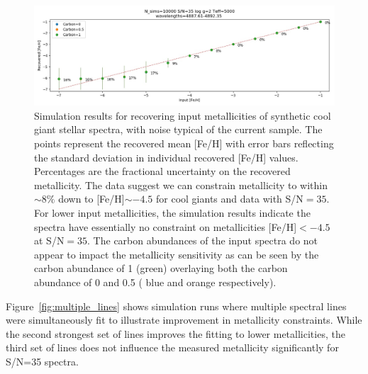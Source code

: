 \documentclass[]{aastex631}
\newcommand{\feh}{[Fe/H]\xspace}
\begin{document}
\begin{figure}
    \includegraphics[width=\linewidth]{Plots/sim_plots/Nsim10000_SN35_logg2_T5000_Thomas_4890.jpg}
    \caption{Simulation results for recovering input metallicities of synthetic cool giant stellar spectra, with noise typical of the current sample. The points represent the recovered mean \feh with error bars reflecting the standard deviation in individual recovered \feh values. Percentages are the fractional uncertainty on the recovered metallicity. 
    The data suggest we can constrain metallicity to within $\sim8\%$ down to \feh $\sim-4.5$ for cool giants and data with S/N$=35$. For lower input metallicities, the simulation results indicate the spectra have essentially no constraint on metallicities \feh $<-4.5$ at S/N$=35$. The carbon abundances of the input spectra do not appear to impact the metallicity sensitivity as can be seen by the carbon abundance of 1 (green) overlaying both the carbon abundance of 0 and 0.5 ( blue and orange respectively).}
    \label{fig:simulation}
\end{figure}

Figure~\ref{fig:multiple_lines} shows simulation runs where multiple spectral lines were simultaneously fit to illustrate improvement in metallicity constraints. While the second strongest set of lines improves the fitting to lower metallicities, the third set of lines does not influence the measured metallicity significantly for S/N=35 spectra.
\end{document}
